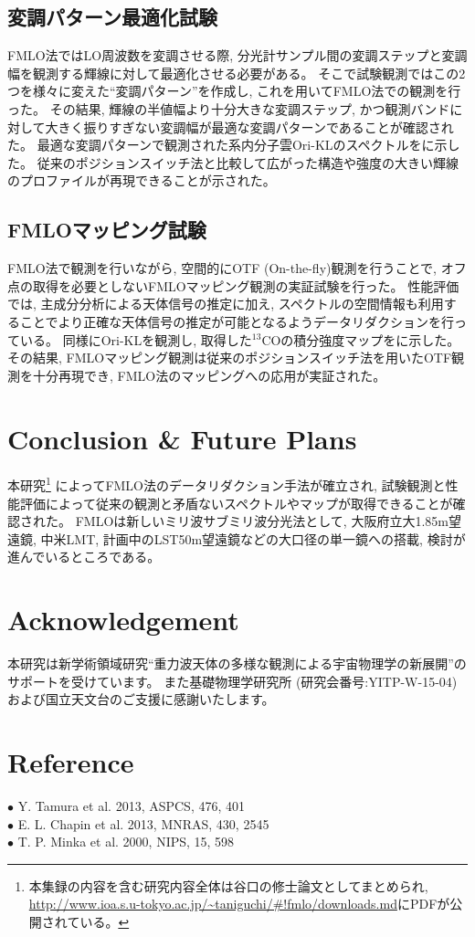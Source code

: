 \documentclass[a4paper,10pt,oneside,twocolumn,notitlepage,final]{jarticle}
\begin{document}
\vspace{-5mm}
\subsection{変調パターン最適化試験}
FMLO法ではLO周波数を変調させる際, 分光計サンプル間の変調ステップと変調幅を観測する輝線に対して最適化させる必要がある。
そこで試験観測ではこの2つを様々に変えた``変調パターン''を作成し, これを用いてFMLO法での観測を行った。
その結果, 輝線の半値幅より十分大きな変調ステップ, かつ観測バンドに対して大きく振りすぎない変調幅が最適な変調パターンであることが確認された。
最適な変調パターンで観測された系内分子雲Ori-KLのスペクトルをに示した。
従来のポジションスイッチ法と比較して広がった構造や強度の大きい輝線のプロファイルが再現できることが示された。

\vspace{-5mm}
\subsection{FMLOマッピング試験}
FMLO法で観測を行いながら, 空間的にOTF (On-the-fly)観測を行うことで, オフ点の取得を必要としないFMLOマッピング観測の実証試験を行った。
性能評価では, 主成分分析による天体信号の推定に加え, スペクトルの空間情報も利用することでより正確な天体信号の推定が可能となるようデータリダクションを行っている。
同様にOri-KLを観測し, 取得した$^{13}$COの積分強度マップをに示した。
その結果, FMLOマッピング観測は従来のポジションスイッチ法を用いたOTF観測を十分再現でき, FMLO法のマッピングへの応用が実証された。

\vspace{-5mm}
\section{Conclusion \& Future Plans}
本研究\footnote{本集録の内容を含む研究内容全体は谷口の修士論文としてまとめられ, \url{http://www.ioa.s.u-tokyo.ac.jp/~taniguchi/#!fmlo/downloads.md}にPDFが公開されている。}
によってFMLO法のデータリダクション手法が確立され, 試験観測と性能評価によって従来の観測と矛盾ないスペクトルやマップが取得できることが確認された。
FMLOは新しいミリ波サブミリ波分光法として, 大阪府立大1.85m望遠鏡, 中米LMT, 計画中のLST50m望遠鏡などの大口径の単一鏡への搭載, 検討が進んでいるところである。

\vspace{-5mm}
\section*{Acknowledgement}
\noindent
本研究は新学術領域研究``重力波天体の多様な観測による宇宙物理学の新展開''のサポートを受けています。
また基礎物理学研究所 (研究会番号:YITP-W-15-04)および国立天文台のご支援に感謝いたします。

\vspace{-5mm}
\section*{Reference}
\noindent
$\bullet$ Y. Tamura et al. 2013, ASPCS, 476, 401\\
$\bullet$ E. L. Chapin et al. 2013, MNRAS, 430, 2545\\
$\bullet$ T. P. Minka et al. 2000, NIPS, 15, 598
\vspace{5mm}
\end{document}
